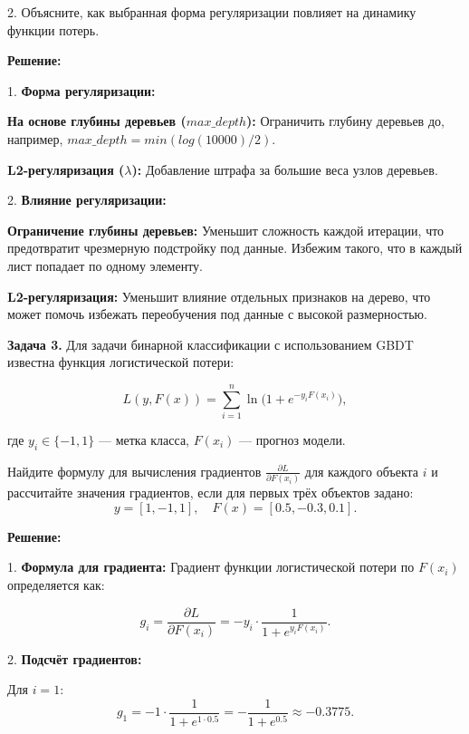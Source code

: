 2. Объясните, как выбранная форма регуляризации повлияет на динамику функции потерь.


\textbf{Решение:}

1. \textbf{Форма регуляризации:}
\vspace{0.3cm}

\textbf{На основе глубины деревьев (\(max\_depth\)):}
Ограничить глубину деревьев до, например, \(max\_depth = min(log(10000)/2)\).
\vspace{0.3cm}

\textbf{L2-регуляризация (\(\lambda\)):}
Добавление штрафа за большие веса узлов деревьев.
\vspace{0.5cm}

2. \textbf{Влияние регуляризации:}
\vspace{0.3cm}

\textbf{Ограничение глубины деревьев:}
Уменьшит сложность каждой итерации, что предотвратит чрезмерную подстройку под данные. Избежим такого, что в каждый лист попадает по одному элементу.
\vspace{0.3cm}

\textbf{L2-регуляризация:}
Уменьшит влияние отдельных признаков на дерево, что может помочь избежать переобучения под данные с высокой размерностью.






\vspace{1cm}

\textbf{Задача 3.}
Для задачи бинарной классификации с использованием GBDT известна функция логистической потери:

\[
    L(y, F(x)) = \sum_{i=1}^n \ln\big(1 + e^{-y_i F(x_i)}\big),
\]

где \(y_i \in \{-1, 1\}\) — метка класса, \(F(x_i)\) — прогноз модели.

Найдите формулу для вычисления градиентов \(\frac{\partial L}{\partial F(x_i)}\) для каждого объекта \(i\) и рассчитайте значения градиентов, если для первых трёх объектов задано:
\[
    y = [1, -1, 1], \quad F(x) = [0.5, -0.3, 0.1].
\]

\textbf{Решение:}

1. \textbf{Формула для градиента:}
Градиент функции логистической потери по \(F(x_i)\) определяется как:

\[
    g_i = \frac{\partial L}{\partial F(x_i)} = -y_i \cdot \frac{1}{1 + e^{y_i F(x_i)}}.
\]

2. \textbf{Подсчёт градиентов:}

Для \(i = 1\):
\[
    g_1 = -1 \cdot \frac{1}{1 + e^{1 \cdot 0.5}} = -\frac{1}{1 + e^{0.5}} \approx -0.3775.
\]

